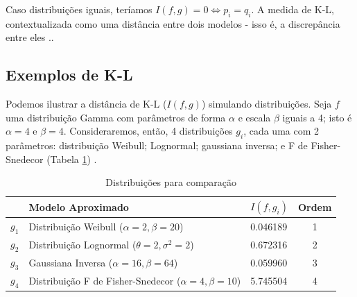 Caso distribuições iguais, teríamos $I(f,g) = 0 \iff p_i = q_i$. A medida de K-L, contextualizada como uma distância entre dois modelos - isso é, a discrepância entre eles  \cite[p. 51]{burnham2002practical}..

\subsection{Exemplos de K-L}

Podemos ilustrar a distância de K-L ($I(f, g)$) simulando distribuições. Seja $f$ uma distribuição Gamma com parâmetros de forma $\alpha$ e escala $\beta$ iguais a 4; isto é $\alpha = 4$ e $\beta = 4$. Consideraremos, então, 4 distribuições $g_i$, cada uma com 2 parâmetros: distribuição Weibull; Lognormal; gaussiana inversa; e F de Fisher-Snedecor (Tabela \ref{ref:tabeladist}) \cite[p. 54]{burnham2002practical}.

\begin{table}[!h]
\centering
\caption{Distribuições para comparação}
\begin{tabular}{lllc}
\hline
      & Modelo Aproximado                                            & $I(f, g_i)$ & Ordem \\ \hline
$g_1$ & Distribuição Weibull ($\alpha = 2, \beta = 20$)              & 0.046189    & 1     \\
$g_2$ & Distribuição Lognormal ($\theta = 2, \sigma^2 = 2$)          & 0.672316    & 2     \\
$g_3$ & Gaussiana Inversa ($\alpha = 16, \beta = 64$)                & 0.059960    & 3     \\
$g_4$ & Distribuição F de Fisher-Snedecor ($\alpha = 4, \beta = 10$) & 5.745504    & 4     \\ \hline
\end{tabular}
\label{ref:tabeladist}
\end{table}

